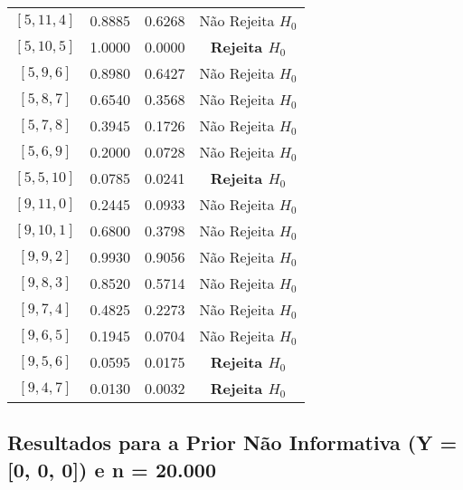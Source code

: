 \documentclass[12pt, a4paper]{article}
\begin{document}
\begin{table}[H]
\begin{tabular}{cccc}
        {$[5, 11, 4]$} & 0.8885 & 0.6268 & Não Rejeita $H_0$ \\
        {$[5, 10, 5]$} & 1.0000 & 0.0000 & \textbf{Rejeita $H_0$} \\
        {$[5, 9, 6]$}  & 0.8980 & 0.6427 & Não Rejeita $H_0$ \\
        {$[5, 8, 7]$}  & 0.6540 & 0.3568 & Não Rejeita $H_0$ \\
        {$[5, 7, 8]$}  & 0.3945 & 0.1726 & Não Rejeita $H_0$ \\
        {$[5, 6, 9]$}  & 0.2000 & 0.0728 & Não Rejeita $H_0$ \\
        {$[5, 5, 10]$} & 0.0785 & 0.0241 & \textbf{Rejeita $H_0$} \\
        \midrule
        {$[9, 11, 0]$} & 0.2445 & 0.0933 & Não Rejeita $H_0$ \\
        {$[9, 10, 1]$} & 0.6800 & 0.3798 & Não Rejeita $H_0$ \\
        {$[9, 9, 2]$}  & 0.9930 & 0.9056 & Não Rejeita $H_0$ \\
        {$[9, 8, 3]$}  & 0.8520 & 0.5714 & Não Rejeita $H_0$ \\
        {$[9, 7, 4]$}  & 0.4825 & 0.2273 & Não Rejeita $H_0$ \\
        {$[9, 6, 5]$}  & 0.1945 & 0.0704 & Não Rejeita $H_0$ \\
        {$[9, 5, 6]$}  & 0.0595 & 0.0175 & \textbf{Rejeita $H_0$} \\
        {$[9, 4, 7]$}  & 0.0130 & 0.0032 & \textbf{Rejeita $H_0$} \\
        \bottomrule
    \end{tabular}
\end{table}



\subsection{Resultados para a Prior Não Informativa (Y = [0, 0, 0]) e n = 20.000}
\end{document}
